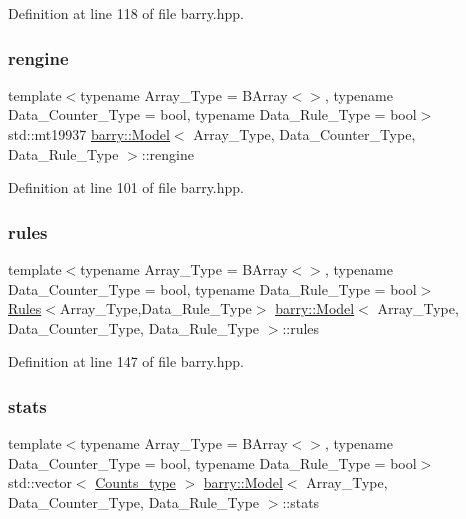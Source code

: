 Definition at line 118 of file barry.\+hpp.

\mbox{\label{classbarry_1_1_model_af7ba92e1910b1b19b1a4d7436f1aa19b}} 
\subsubsection{\texorpdfstring{rengine}{rengine}}
{\footnotesize\ttfamily template$<$typename Array\+\_\+\+Type  = B\+Array$<$$>$, typename Data\+\_\+\+Counter\+\_\+\+Type  = bool, typename Data\+\_\+\+Rule\+\_\+\+Type  = bool$>$ \\
std\+::mt19937 \hyperlink{classbarry_1_1_model}{barry\+::\+Model}$<$ Array\+\_\+\+Type, Data\+\_\+\+Counter\+\_\+\+Type, Data\+\_\+\+Rule\+\_\+\+Type $>$\+::rengine}



Definition at line 101 of file barry.\+hpp.

\mbox{\label{classbarry_1_1_model_a53e5242ce0ed2bc7194a0662d09493f2}} 
\subsubsection{\texorpdfstring{rules}{rules}}
{\footnotesize\ttfamily template$<$typename Array\+\_\+\+Type  = B\+Array$<$$>$, typename Data\+\_\+\+Counter\+\_\+\+Type  = bool, typename Data\+\_\+\+Rule\+\_\+\+Type  = bool$>$ \\
\hyperlink{classbarry_1_1_rules}{Rules}$<$Array\+\_\+\+Type,Data\+\_\+\+Rule\+\_\+\+Type$>$ \hyperlink{classbarry_1_1_model}{barry\+::\+Model}$<$ Array\+\_\+\+Type, Data\+\_\+\+Counter\+\_\+\+Type, Data\+\_\+\+Rule\+\_\+\+Type $>$\+::rules}



Definition at line 147 of file barry.\+hpp.

\mbox{\label{classbarry_1_1_model_a09fa1641ee40f23bad698a7c78db4b87}} 
\subsubsection{\texorpdfstring{stats}{stats}}
{\footnotesize\ttfamily template$<$typename Array\+\_\+\+Type  = B\+Array$<$$>$, typename Data\+\_\+\+Counter\+\_\+\+Type  = bool, typename Data\+\_\+\+Rule\+\_\+\+Type  = bool$>$ \\
std\+::vector$<$ \hyperlink{namespacebarry_a3e2d8c3b6cf602107559d4237d9f1315}{Counts\+\_\+type} $>$ \hyperlink{classbarry_1_1_model}{barry\+::\+Model}$<$ Array\+\_\+\+Type, Data\+\_\+\+Counter\+\_\+\+Type, Data\+\_\+\+Rule\+\_\+\+Type $>$\+::stats}



